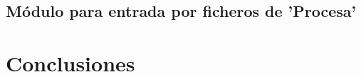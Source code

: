 \documentclass[twoside, 12pt]{epstfg}
\begin{document}
\section{Módulo para entrada por ficheros de 'Procesa'}

\chapter{Conclusiones}
\label{chap:Conclusiones}

\backmatter
\appendix

\cleardoublepage

\nocite{*}
{}

\cleardoublepage
\printindex
\end{document}
